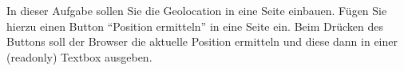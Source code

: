 %
\par In dieser Aufgabe sollen Sie die Geolocation in eine Seite einbauen. Fügen Sie hierzu einen Button ``Position ermitteln'' in eine Seite ein. Beim Drücken des Buttons soll der Browser die aktuelle Position ermitteln und diese dann in einer (readonly) Textbox ausgeben.